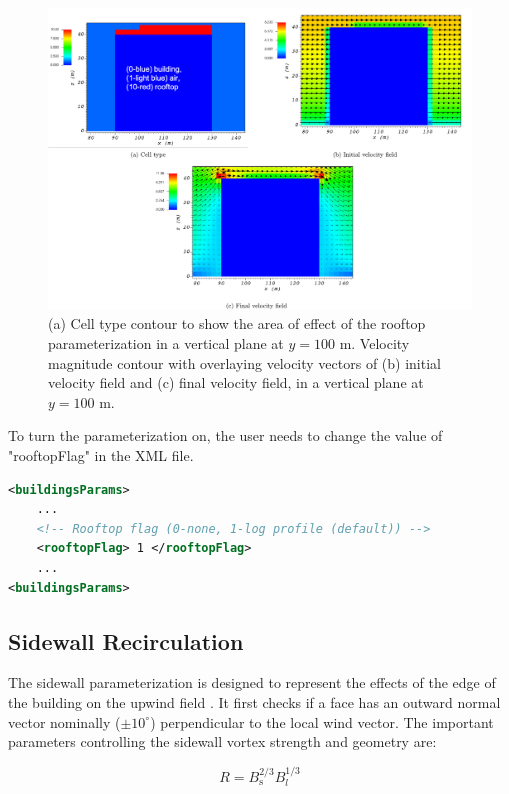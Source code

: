 \begin{figure}[H]
    \centering
    \includegraphics[width=\textwidth]{Images/rooftop_y_100_1.pdf}
    \caption{(a) Cell type contour to show the area of effect of the rooftop parameterization in a vertical plane at $y=100$ m. Velocity magnitude contour with overlaying velocity vectors of (b) initial velocity field and (c) final velocity field, in a vertical plane at $y=100$ m.}
\end{figure}

To turn the parameterization on, the user needs to change the value of "rooftopFlag" in the XML file.

\begin{lstlisting}[language=XML]
<buildingsParams>
	...
	<!-- Rooftop flag (0-none, 1-log profile (default)) -->
	<rooftopFlag> 1 </rooftopFlag>
	...
<buildingsParams>
\end{lstlisting}

\subsection{Sidewall Recirculation}

The sidewall parameterization is designed to represent the effects of the edge of the building on the upwind field \cite{hayati2017comprehensive}. It first checks if a face has an outward normal vector nominally ($\pm 10^{\circ}$) perpendicular to the local wind vector. The important parameters controlling the sidewall vortex strength and geometry are:

\begin{equation}
R=B_{\mathrm{s}}^{2 / 3} B_{l}^{1 / 3}
\end{equation}


